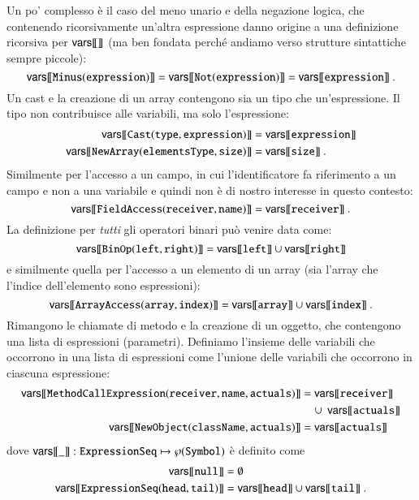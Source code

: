 Un po' \piu complesso \`e il caso del meno unario e della negazione logica,
che contenendo ricorsivamente un'altra espressione danno origine a una
definizione ricorsiva per ${\mathsf{vars}[\![{}]\!]}$ (ma ben fondata perch\'e andiamo verso
strutture sintattiche sempre \piu piccole):
\[
  {\mathsf{vars}[\![{\mathtt{Minus(expression)}}]\!]}={\mathsf{vars}[\![{\mathtt{Not(expression)}}]\!]}
    ={\mathsf{vars}[\![{\mathtt{expression}}]\!]}~.
\]
Un cast e la creazione di un array contengono sia un tipo che un'espressione.
Il tipo non contribuisce alle variabili, ma solo l'espressione:
%
\begin{align*}
  \vars{\mathtt{Cast(type,expression)}}&=\vars{\mathtt{expression}}\\
  \vars{\mathtt{NewArray(elementsType,size)}}&=\vars{\mathtt{size}}~.
\end{align*}
%
Similmente per l'accesso a un campo, in cui l'identificatore fa riferimento
a un campo e non a una variabile e quindi non \`e di nostro interesse in questo
contesto:
%
\begin{equation}\label{eq:vars_fieldaccess}
  {\mathsf{vars}[\![{\mathtt{FieldAccess(receiver,name)}}]\!]}={\mathsf{vars}[\![{\mathtt{receiver}}]\!]}~.
\end{equation}
%
La definizione per \emph{tutti} gli operatori binari pu\`o venire data come:
\begin{equation}\label{eq:vars_binop}
  {\mathsf{vars}[\![{\mathtt{BinOp(left,right)}}]\!]}={\mathsf{vars}[\![{\mathtt{left}}]\!]}\cup
    {\mathsf{vars}[\![{\mathtt{right}}]\!]}
\end{equation}
%
e similmente quella per l'accesso a un elemento di un array (sia l'array che
l'indice dell'elemento sono espressioni):
\[
  {\mathsf{vars}[\![{\mathtt{ArrayAccess(array,index)}}]\!]}={\mathsf{vars}[\![{\mathtt{array}}]\!]}\cup
    {\mathsf{vars}[\![{\mathtt{index}}]\!]}~.
\]
%
Rimangono le chiamate di metodo e la creazione di un oggetto, che contengono
una lista di espressioni (parametri). Definiamo
l'insieme delle variabili che occorrono in una lista di espressioni come
l'unione delle variabili che occorrono in ciascuna espressione:
%
\begin{align*}
  \vars{\mathtt{MethodCallExpression(receiver,name,actuals)}}
    &=\vars{\mathtt{receiver}}\\
  &\quad\cup\ \vars{\mathtt{actuals}}\\
  \vars{\mathtt{NewObject(className,actuals)}}&=\vars{\mathtt{actuals}}
\end{align*}
%
dove ${\mathsf{vars}[\![{\_}]\!]}:\mathtt{ExpressionSeq}\mapsto\wp(\mathtt{Symbol})$ \`e
definito come
%
\begin{align*}
  \vars{\mathtt{null}}&=\emptyset\\
  \vars{\mathtt{ExpressionSeq(head,tail)}}&=\vars{\mathtt{head}}\cup
    \vars{\mathtt{tail}}~.
\end{align*}

